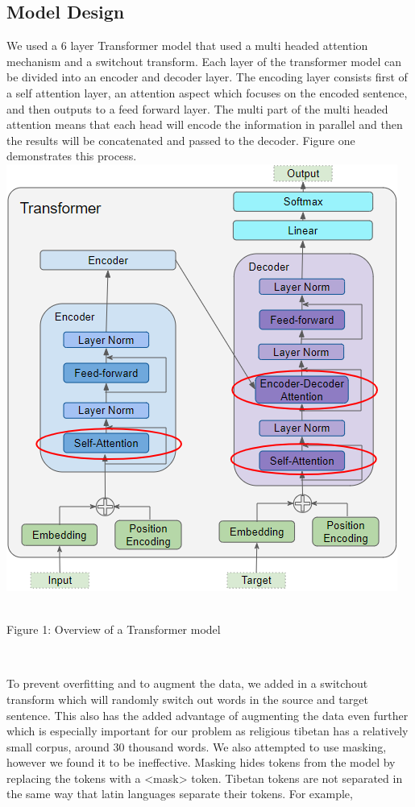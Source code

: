 \documentclass[letterpaper, 10 pt, conference]{ieeeconf}  %
\begin{document}
\subsection{Model Design}
We used a 6 layer Transformer model that used a multi headed attention mechanism and a switchout transform. Each layer of the transformer model can be divided into an encoder and decoder layer. The encoding layer consists first of a self attention layer, an attention aspect which focuses on the encoded sentence, and then outputs to a feed forward layer. The multi part of the multi headed attention means that each head will encode the information in parallel and then the results will be concatenated and passed to the decoder. Figure one demonstrates this process.
\includegraphics[scale=.4]{Transformer.png}
\caption{\\Figure 1: Overview of a Transformer model}
\\
\par
To prevent overfitting and to augment the data, we added in a switchout transform which will randomly switch out words in the source and target sentence. This also has the added advantage of augmenting the data even further which is especially important for our problem as religious tibetan has a relatively small corpus, around 30 thousand words. We also attempted to use masking, however we found it to be ineffective. Masking hides tokens from the model by replacing the tokens with a <mask> token. Tibetan tokens are not separated in the same way that latin languages separate their tokens. For example,
\end{document}

